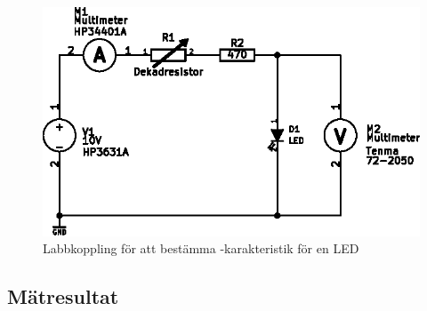 \documentclass[11pt,a4paper]{article}
\begin{document}
\begin{figure}
    \centering
    \includegraphics[width=0.8\linewidth]{img/6-schem}
    \caption[Bestämning av I/V-karakteristik hos LED]
    {Labbkoppling för att bestämma -karakteristik för en LED}
    \label{fig:6-schem}
\end{figure}


\subsection{Mätresultat}\label{led-results}
\end{document}
